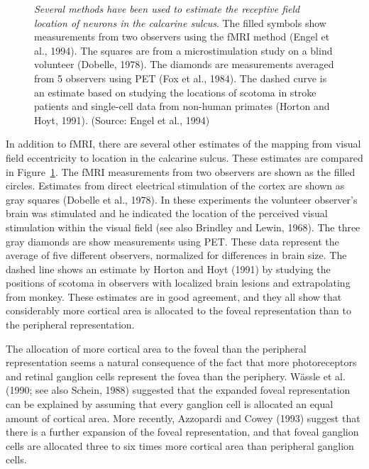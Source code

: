 \begin{figure}
\centerline{
}
\caption[Cortical Magnification]{
{\em Several methods have been used
to estimate the receptive field location of neurons in the calcarine sulcus}.
The filled symbols show measurements from two observers using
the fMRI method (Engel et al., 1994).
The squares are from a microstimulation study
on a blind volunteer (Dobelle, 1978).
The diamonds are measurements averaged
from 5 observers using PET (Fox et al., 1984).
The dashed curve is an estimate based on
studying the locations of scotoma in stroke patients
and single-cell data from non-human primates (Horton and Hoyt, 1991).
(Source: Engel et al., 1994) }
\label{f5:cortMag}
\end{figure}
In addition to fMRI,
there are several other estimates of the mapping from
visual field eccentricity to location
in the calcarine sulcus.
These estimates are compared in Figure~\ref{f5:cortMag}.  
The fMRI measurements from two observers are shown as the filled circles.
Estimates from direct electrical stimulation of the cortex
are shown as gray squares (Dobelle et al., 1978).
In these experiments
the volunteer observer's brain was stimulated and he
indicated the
location of the perceived visual stimulation within the visual field
(see also Brindley and Lewin, 1968).  
The three gray diamonds are show measurements using PET.
These data represent the average
of five different observers, normalized for differences
in brain size.
The dashed line shows an
estimate by Horton and Hoyt (1991)
by studying the positions of scotoma in observers
with localized brain lesions and extrapolating from monkey.
These estimates are in good agreement,
and they all show that
considerably more cortical area is allocated to the foveal
representation than to the peripheral representation.

The allocation of more cortical area to
the foveal than the peripheral representation 
seems a natural consequence of
the fact that more photoreceptors and
retinal ganglion cells represent
the fovea than the periphery.
W\"assle et al. (1990; see also Schein, 1988) suggested
that the expanded foveal representation can be explained
by assuming that every ganglion cell is allocated an equal
amount of cortical area.
More recently,
Azzopardi and Cowey (1993) suggest that there is
a further expansion of the foveal representation,
and that foveal ganglion cells
are allocated three to six times more cortical area
than peripheral ganglion cells.

